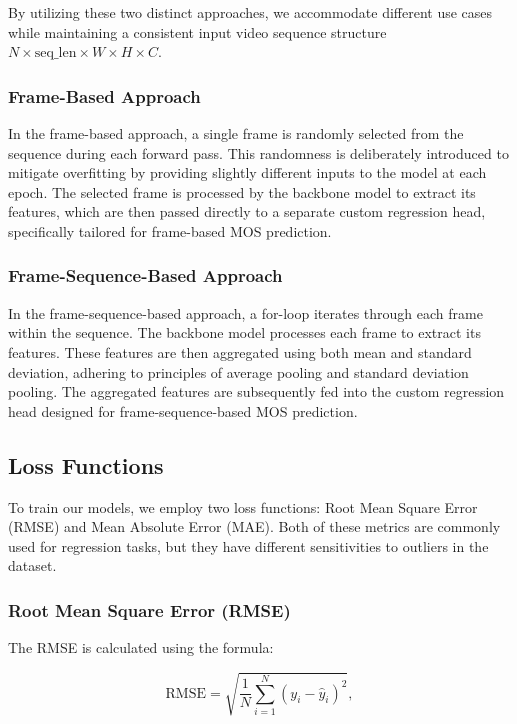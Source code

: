 \documentclass[a4paper,12pt,openright]{book}
\begin{document}
By utilizing these two distinct approaches, we accommodate different use cases while maintaining a consistent input video sequence structure \(N \times \text{seq\_len} \times W \times H \times C\).

\subsubsection{Frame-Based Approach}

In the frame-based approach, a single frame is randomly selected from the sequence during each forward pass. This randomness is deliberately introduced to mitigate overfitting by providing slightly different inputs to the model at each epoch. The selected frame is processed by the backbone model to extract its features, which are then passed directly to a separate custom regression head, specifically tailored for frame-based MOS prediction.


\subsubsection{Frame-Sequence-Based Approach}
\label{frame:based}

In the frame-sequence-based approach, a for-loop iterates through each frame within the sequence. The backbone model processes each frame to extract its features. These features are then aggregated using both mean and standard deviation, adhering to principles of average pooling and standard deviation pooling. The aggregated features are subsequently fed into the custom regression head designed for frame-sequence-based MOS prediction.

\newpage

\subsection{Loss Functions}

To train our models, we employ two loss functions: Root Mean Square Error (RMSE) and Mean Absolute Error (MAE). Both of these metrics are commonly used for regression tasks, but they have different sensitivities to outliers in the dataset.

\subsubsection{Root Mean Square Error (RMSE)}
\label{rmse}
The RMSE is calculated using the formula:

\begin{equation}
\text{RMSE} = \sqrt{\frac{1}{N} \sum_{i=1}^{N} (y_{i} - \hat{y}_{i})^2},
\end{equation}
\end{document}
